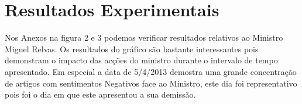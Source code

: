 \section{Resultados Experimentais}
\hspace{15pt} Nos Anexos na figura 2 e 3 podemos verificar resultados relativos ao Ministro Miguel Relvas. Os resultados do gráfico são bastante interessantes pois demonstram o impacto das acções do ministro durante o intervalo de tempo apresentado. Em especial a data de 5/4/2013 demostra uma grande concentração de artigos com sentimentos Negativos face ao Ministro, este dia foi representativo pois foi o dia em que este apresentou a sua demissão. 
